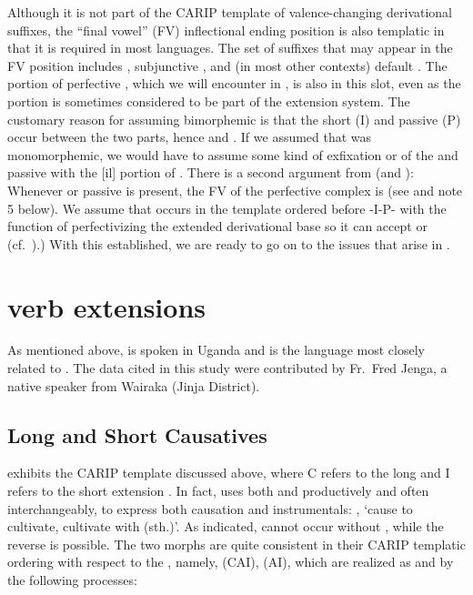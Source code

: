 \documentclass[output=paper,
modfonts
]{LSP/langsci}
\begin{document}
Although it is not part of the CARIP template of valence-changing
derivational suffixes, the ``final vowel'' (FV) inflectional ending
position is also templatic in that it is required in most 
languages. The set of suffixes that may appear in the FV position
includes  , subjunctive , and (in most
other contexts) default . The  portion of perfective
, which we will encounter in , is also in this slot, even
as the  portion is sometimes considered to be part of the
extension system. The customary reason for assuming bimorphemic
 is that the short  (I) and passive (P) occur
between the two parts, hence  and  \citep{bastin1983}. If we assumed that  was monomorphemic, we would have
to assume some kind of exfixation or  of the  and
passive with the {[}il{]} portion of . There is a second
argument from  (and ): Whenever   or
passive  is present, the FV of the perfective complex is
 (see  and note 5 below). We assume that 
occurs in the template ordered before -I-P- with the function of
perfectivizing the extended derivational base so it can accept 
or  (cf.\ ).) With this established, we are ready to go on to
the issues that arise in .

\section{ verb extensions}\label{sec:hyman:3}

As mentioned above,  is spoken in Uganda and is the  language
most closely related to . The data cited in this study were
contributed by Fr.\ Fred Jenga, a native speaker from Wairaka (Jinja
District).

\subsection{Long and Short Causatives}

 exhibits the CARIP template discussed above, where  C
refers to the long   and I refers to the short
 extension . In fact,  uses both 
and  productively and often interchangeably, to express both
causation and instrumentals: ,  `cause to
cultivate, cultivate with (sth.)'. As indicated,  cannot
occur without , while the reverse is possible. The two
 morphs are quite consistent in their CARIP templatic ordering
with respect to the , namely,  (CAI),
 (AI), which are realized as  and 
by the following processes:
\end{document}
